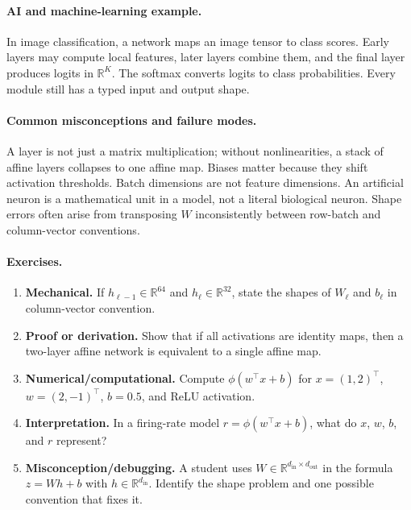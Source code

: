 \paragraph{AI and machine-learning example.}
In image classification, a network maps an image tensor to class scores. Early layers may compute local features, later layers combine them, and the final layer produces logits in \(\mathbb R^K\). The softmax converts logits to class probabilities. Every module still has a typed input and output shape.

\paragraph{Common misconceptions and failure modes.}
A layer is not just a matrix multiplication; without nonlinearities, a stack of affine layers collapses to one affine map. Biases matter because they shift activation thresholds. Batch dimensions are not feature dimensions. An artificial neuron is a mathematical unit in a model, not a literal biological neuron. Shape errors often arise from transposing \(W\) inconsistently between row-batch and column-vector conventions.

\paragraph{Exercises.}
\begin{enumerate}[label=\textbf{37.1.\arabic*.}, leftmargin=*]
\item \textbf{Mechanical.} If \(h_{\ell-1}\in\mathbb R^{64}\) and \(h_\ell\in\mathbb R^{32}\), state the shapes of \(W_\ell\) and \(b_\ell\) in column-vector convention.
\item \textbf{Proof or derivation.} Show that if all activations are identity maps, then a two-layer affine network is equivalent to a single affine map.
\item \textbf{Numerical/computational.} Compute \(\phi(w^\top x+b)\) for \(x=(1,2)^\top\), \(w=(2,-1)^\top\), \(b=0.5\), and ReLU activation.
\item \textbf{Interpretation.} In a firing-rate model \(r=\phi(w^\top x+b)\), what do \(x\), \(w\), \(b\), and \(r\) represent?
\item \textbf{Misconception/debugging.} A student uses \(W\in\mathbb R^{d_{\mathrm{in}}\times d_{\mathrm{out}}}\) in the formula \(z=Wh+b\) with \(h\in\mathbb R^{d_{\mathrm{in}}}\). Identify the shape problem and one possible convention that fixes it.
\end{enumerate}

